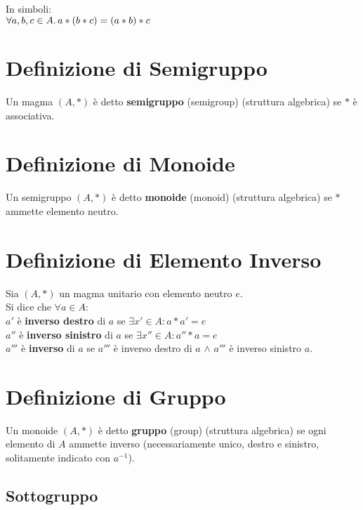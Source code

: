 \documentclass[a4paper, twoside, italian, 11pt]{book}
\begin{document}
\noindent
In simboli: \\

$\forall a,b,c \in A \ldotp a * (b * c) = (a * b) * c$



\section{Definizione di Semigruppo}

Un magma $(A, *)$ è detto \textbf{semigruppo} (semigroup) (struttura algebrica) se $*$ è associativa.



\section{Definizione di Monoide}

Un semigruppo $(A, *)$ è detto \textbf{monoide} (monoid) (struttura algebrica) se $*$ ammette elemento neutro.



\section{Definizione di Elemento Inverso}

Sia $(A, *)$ un magma unitario con elemento neutro $e$. \\
Si dice che $\forall a \in A$: \\

$a'$ è \textbf{inverso destro} di $a$ se $\exists x' \in A : a * a' = e$ \\
\indent
$a''$ è \textbf{inverso sinistro} di $a$ se $\exists x'' \in A : a'' * a = e$ \\
\indent
$a'''$ è \textbf{inverso} di $a$ se $a'''$ è inverso destro di $a$ $\land$ $a'''$ è inverso sinistro $a$.



\section{Definizione di Gruppo}

Un monoide $(A, *)$ è detto \textbf{gruppo} (group) (struttura algebrica) se ogni elemento di $A$ ammette inverso (necessariamente unico, destro e sinistro, solitamente indicato con $a^{-1}$).


\subsection{Sottogruppo}
\end{document}
